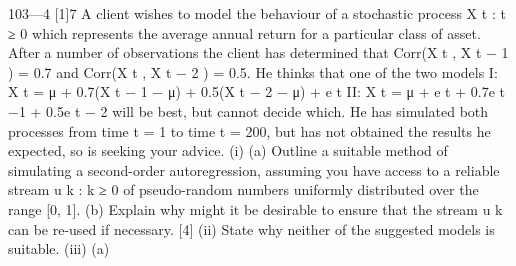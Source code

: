 \documentclass[a4paper,12pt]{article}
\begin{document}
\begin{enumerate}
103—4
[1]7
A client wishes to model the behaviour of a stochastic process {X t : t ≥ 0} which
represents the average annual return for a particular class of asset. After a
number of observations the client has determined that Corr(X t , X t − 1 ) = 0.7 and
Corr(X t , X t − 2 ) = 0.5. He thinks that one of the two models
I: X t = μ + 0.7(X t − 1 − μ) + 0.5(X t − 2 − μ) + e t
II: X t = μ + e t + 0.7e t −1 + 0.5e t − 2
will be best, but cannot decide which. He has simulated both processes from time
t = 1 to time t = 200, but has not obtained the results he expected, so is seeking
your advice.
(i)
(a) Outline a suitable method of simulating a second-order
autoregression, assuming you have access to a reliable stream
{u k : k ≥ 0} of pseudo-random numbers uniformly distributed over
the range [0, 1].
(b) Explain why might it be desirable to ensure that the stream {u k }
can be re-used if necessary.
[4]
(ii) State why neither of the suggested models is suitable.
(iii) (a)


\end{enumerate}
\end{document}
